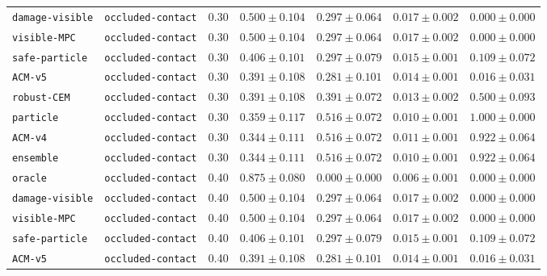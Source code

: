\documentclass{article}
\begin{document}
\begin{center}
\begin{tabular}{llccccc}
\texttt{damage-visible} & \texttt{occluded-contact} & 0.30 & $0.500 \pm 0.104$ & $0.297 \pm 0.064$ & $0.017 \pm 0.002$ & $0.000 \pm 0.000$ \\
\texttt{visible-MPC} & \texttt{occluded-contact} & 0.30 & $0.500 \pm 0.104$ & $0.297 \pm 0.064$ & $0.017 \pm 0.002$ & $0.000 \pm 0.000$ \\
\texttt{safe-particle} & \texttt{occluded-contact} & 0.30 & $0.406 \pm 0.101$ & $0.297 \pm 0.079$ & $0.015 \pm 0.001$ & $0.109 \pm 0.072$ \\
\texttt{ACM-v5} & \texttt{occluded-contact} & 0.30 & $0.391 \pm 0.108$ & $0.281 \pm 0.101$ & $0.014 \pm 0.001$ & $0.016 \pm 0.031$ \\
\texttt{robust-CEM} & \texttt{occluded-contact} & 0.30 & $0.391 \pm 0.108$ & $0.391 \pm 0.072$ & $0.013 \pm 0.002$ & $0.500 \pm 0.093$ \\
\texttt{particle} & \texttt{occluded-contact} & 0.30 & $0.359 \pm 0.117$ & $0.516 \pm 0.072$ & $0.010 \pm 0.001$ & $1.000 \pm 0.000$ \\
\texttt{ACM-v4} & \texttt{occluded-contact} & 0.30 & $0.344 \pm 0.111$ & $0.516 \pm 0.072$ & $0.011 \pm 0.001$ & $0.922 \pm 0.064$ \\
\texttt{ensemble} & \texttt{occluded-contact} & 0.30 & $0.344 \pm 0.111$ & $0.516 \pm 0.072$ & $0.010 \pm 0.001$ & $0.922 \pm 0.064$ \\
\texttt{oracle} & \texttt{occluded-contact} & 0.40 & $0.875 \pm 0.080$ & $0.000 \pm 0.000$ & $0.006 \pm 0.001$ & $0.000 \pm 0.000$ \\
\texttt{damage-visible} & \texttt{occluded-contact} & 0.40 & $0.500 \pm 0.104$ & $0.297 \pm 0.064$ & $0.017 \pm 0.002$ & $0.000 \pm 0.000$ \\
\texttt{visible-MPC} & \texttt{occluded-contact} & 0.40 & $0.500 \pm 0.104$ & $0.297 \pm 0.064$ & $0.017 \pm 0.002$ & $0.000 \pm 0.000$ \\
\texttt{safe-particle} & \texttt{occluded-contact} & 0.40 & $0.406 \pm 0.101$ & $0.297 \pm 0.079$ & $0.015 \pm 0.001$ & $0.109 \pm 0.072$ \\
\texttt{ACM-v5} & \texttt{occluded-contact} & 0.40 & $0.391 \pm 0.108$ & $0.281 \pm 0.101$ & $0.014 \pm 0.001$ & $0.016 \pm 0.031$ \\
\bottomrule
\end{tabular}
\end{center}
\end{document}
